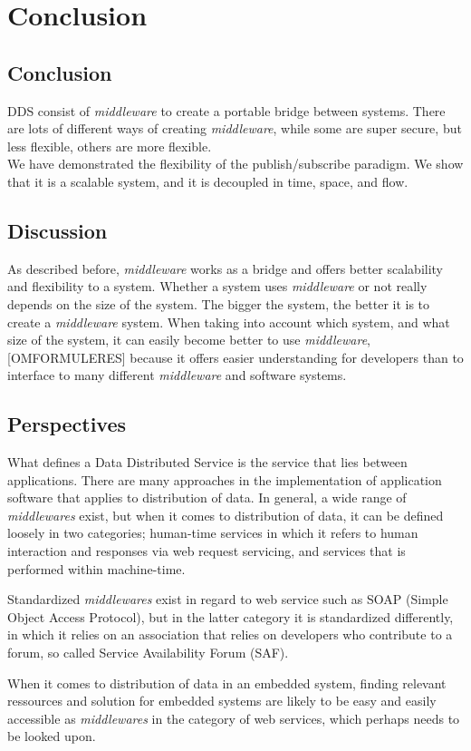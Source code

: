 \chapter{Conclusion}
\section{Conclusion}
DDS consist of \emph{middleware} to create a portable bridge between systems.
There are lots of different ways of creating \emph{middleware}, while some are super secure, but less flexible, others are more flexible. \\
We have demonstrated the flexibility of the publish/subscribe paradigm. We show that it is a scalable system, and it is decoupled in time, space, and flow.

\section{Discussion}
As described before, \emph{middleware} works as a bridge and offers better scalability and flexibility to a system. Whether a system uses \emph{middleware} or not really depends on the size of the system. The bigger the system, the better it is to create a \emph{middleware} system. When taking into account which system, and what size of the system, it can easily become better to use \emph{middleware}, 
[OMFORMULERES]
because it offers easier understanding for developers than to interface to many different \emph{middleware} and software systems.\\

\section{Perspectives}
What defines a Data Distributed Service is the service that lies between applications. There are many approaches in the implementation of application software that applies to distribution of data. In general, a wide range of \emph{middlewares} exist, but when it comes to distribution of data, it can be defined loosely in two categories; human-time services in which it refers to human interaction and responses via web request servicing, and services that is performed within machine-time.

Standardized \emph{middlewares} exist in regard to web service such as SOAP (Simple Object Access Protocol), but in the latter category it is standardized differently, in which it relies on an association that relies on developers who contribute to a forum, so called Service Availability Forum (SAF).

When it comes to distribution of data in an embedded system, finding relevant ressources and solution for embedded systems are likely to be easy and easily accessible as \emph{middlewares} in the category of web services, which perhaps needs to be looked upon. 